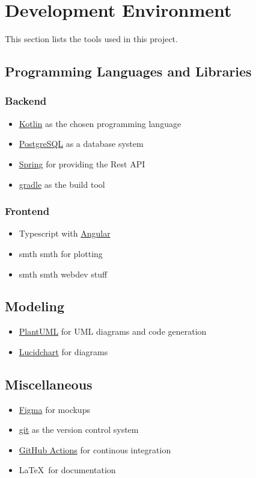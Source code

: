 \section{Development Environment}

This section lists the tools used in this project.

\subsection{Programming Languages and Libraries}

\subsubsection*{Backend}
\begin{itemize}
    \item \href{https://kotlinlang.org/}{Kotlin} as the chosen programming language
    \item \href{https://www.postgresql.org/}{PostgreSQL} as a database system
    \item \href{https://spring.io/}{Spring} for providing the Rest API
    \item \href{https://gradle.org/}{gradle} as the build tool
\end{itemize}

\subsubsection*{Frontend}
\begin{itemize}
    \item Typescript with \href{https://angular.io/}{Angular}
    \item smth smth for plotting
    \item smth smth webdev stuff
\end{itemize}

\subsection{Modeling}
\begin{itemize}
    \item \href{https://plantuml.com/}{PlantUML} for UML diagrams and code generation
    \item \href{https://www.lucidchart.com/}{Lucidchart} for diagrams
\end{itemize}

\subsection{Miscellaneous}
\begin{itemize}
    \item \href{https://www.figma.com/}{Figma} for mockups
    \item \href{https://git-scm.com/}{git} as the version control system
    \item \href{https://github.com/features/actions}{GitHub Actions} for continous integration
    \item \LaTeX \ for documentation
\end{itemize}

